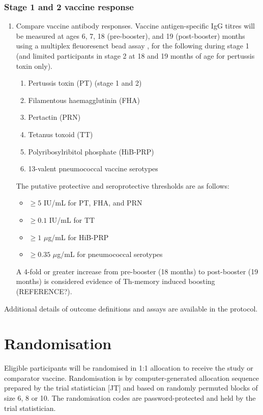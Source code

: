 \documentclass{bmcart}
\begin{document}
\subsubsection*{Stage 1 and 2 vaccine response}

\begin{enumerate}[resume]
	\item Compare vaccine antibody responses.
	Vaccine antigen-specific IgG titres will be measured at ages 6, 7, 18 (pre-booster), and 19 (post-booster) months using a multiplex fleuoresenct bead assay \cite{van2008development}, for the following during stage 1 (and limited participants in stage 2 at 18 and 19 months of age for pertussis toxin only).
	\begin{enumerate}
		\item Pertussis toxin (PT) (stage 1 and 2)
		\item Filamentous haemagglutinin (FHA)
		\item Pertactin (PRN)
		\item Tetanus toxoid (TT)
		\item Polyribosylribitol phosphate (HiB-PRP)
		\item 13-valent pneumococcal vaccine serotypes
	\end{enumerate}
	The putative protective and seroprotective thresholds are as follows:
	\begin{itemize}
		\item $\geq 5$ IU/mL for PT, FHA, and PRN
		\item $\geq 0.1$ IU/mL  for TT \cite{whotetanus}
		\item $\geq 1$ $\mu$g/mL for HiB-PRP \cite{kayhty1983protective}
		\item $\geq 0.35$ $\mu$g/mL for pneumococcal serotypes \cite{siber2007estimating,whopneumo}
	\end{itemize}
	A 4-fold or greater increase from pre-booster (18 months) to post-booster (19 months) is considered evidence of Th-memory induced boosting (REFERENCE?).
\end{enumerate}

Additional details of outcome definitions and assays are available in the protocol.

\section*{Randomisation}

Eligible participants will be randomised in 1:1 allocation to receive the study or comparator vaccine.
Randomisation is by computer-generated allocation sequence prepared by the trial statistician [JT] and based on randomly permuted blocks of size 6, 8 or 10.
The randomisation codes are password-protected and held by the trial statistician.
\end{document}
